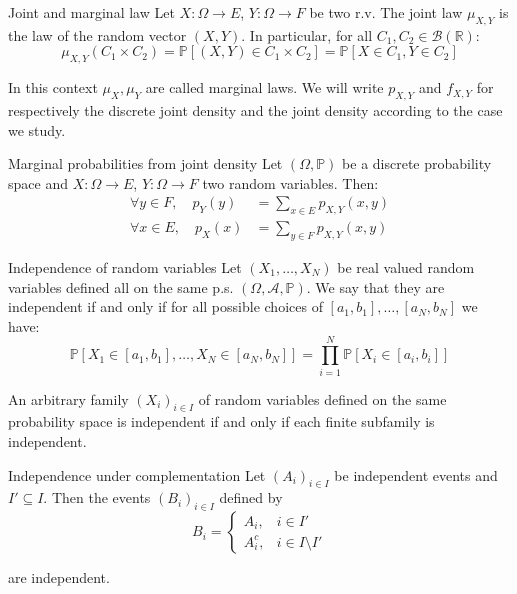 \documentclass[11pt, a4paper]{article}
\begin{document}
\begin{definition}{Joint and marginal law}{}
Let $X: \Omega \rightarrow E$, $Y: \Omega \rightarrow F$ be two r.v. The joint law $\mu_{X,Y}$ is the law of the random vector $(X, Y)$. In particular, for all $C_1, C_2 \in \mathcal{B}(\mathbb{R})$:
\[\mu_{X,Y}(C_1 \times C_2) = \mathbb{P}[(X, Y) \in C_1 \times C_2] = \mathbb{P}[X \in C_1, Y \in C_2]\]

In this context $\mu_X, \mu_Y$ are called marginal laws. We will write $p_{X,Y}$ and $f_{X,Y}$ for respectively the discrete joint density and the joint density according to the case we study.
\end{definition}

\begin{proposition}{Marginal probabilities from joint density}{}
Let $(\Omega, \mathbb{P})$ be a discrete probability space and $X: \Omega \rightarrow E$, $Y: \Omega \rightarrow F$ two random variables. Then:
\begin{align*}
    \forall y \in F, \quad p_Y(y) &= \sum_{x \in E} p_{X,Y}(x,y) \\
    \forall x \in E, \quad p_X(x) &= \sum_{y \in F} p_{X,Y}(x,y)
\end{align*}
\end{proposition}

\begin{definition}{Independence of random variables}{}
Let $(X_1, \dots, X_N)$ be real valued random variables defined all on the same p.s. $(\Omega, \mathscr{A}, \mathbb{P})$. We say that they are independent if and only if for all possible choices of $[a_1, b_1], \dots, [a_N, b_N]$ we have:
\[\mathbb{P}[X_1 \in [a_1, b_1], \dots, X_N \in [a_N, b_N]] = \prod_{i=1}^N \mathbb{P}[X_i \in [a_i, b_i]]\]

An arbitrary family $(X_i)_{i \in I}$ of random variables defined on the same probability space is independent if and only if each finite subfamily is independent.
\end{definition}

\begin{proposition}{Independence under complementation}{}
Let $(A_i)_{i \in I}$ be independent events and $I' \subseteq I$. Then the events $(B_i)_{i \in I}$ defined by
\[B_i = \begin{cases} A_i, & i \in I' \\ A_i^c, & i \in I \setminus I' \end{cases}\]

are independent.
\end{proposition}
\end{document}
